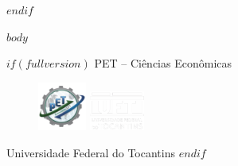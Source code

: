\documentclass[twocolumn, a4paper, 10pt]{report}
\begin{document}
    \clearpage
    {\hypersetup{linkcolor=primarycolor}
	    \tableofcontents\thispagestyle{empty}
    }
    \clearpage


    \printnoidxglossary[toctitle=Siglas, title=Siglas, type=\acronymtype, nonumberlist]\thispagestyle{empty}

    $endif$

    $body$

    $if(fullversion)$
        \clearpage
        \color{white}
        \onecolumn
        \pagestyle{empty} %
        \vspace*{\fill}
        \centering
        \normalsize{PET -- Ciências Econômicas}
        \begin{figure}[H]
            \centering
            \includegraphics[width=1.6cm]{images/pet.png}
            \hspace{5pt}
            \includegraphics[width=1.8cm]{images/uft.png}
        \end{figure}
        \normalsize{Universidade Federal do Tocantins}
    $endif$
\end{document}
